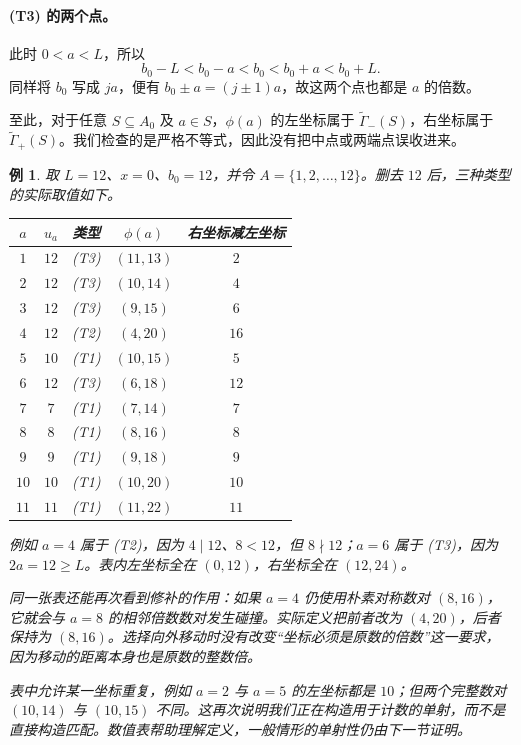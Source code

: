 \documentclass[UTF8,a4paper,oneside,openany,fontset=fandol,zihao=-4]{ctexbook}
\theoremstyle{guide}
\newtheorem{example}[theorem]{例}
\begin{document}
\paragraph{(T3) 的两个点。}
此时 $0<a<L$，所以
\[
  b_0-L<b_0-a<b_0<b_0+a<b_0+L.
\]
同样将 $b_0$ 写成 $ja$，便有 $b_0\pm a=(j\pm1)a$，故这两个点也都是 $a$ 的倍数。

至此，对于任意 $S\subseteq A_0$ 及 $a\in S$，$\phi(a)$ 的左坐标属于 $\widetilde\Gamma_-(S)$，右坐标属于 $\widetilde\Gamma_+(S)$。我们检查的是严格不等式，因此没有把中点或两端点误收进来。

\begin{example}\label{low:type-table}
取 $L=12$、$x=0$、$b_0=12$，并令 $A=\{1,2,\ldots,12\}$。删去 $12$ 后，三种类型的实际取值如下。
\begin{center}
\renewcommand{\arraystretch}{1.12}
\begin{tabular}{c|c|c|c|c}
  $a$ & $u_a$ & 类型 & $\phi(a)$ & 右坐标减左坐标\\
  \hline
  $1$  & $12$ & (T3) & $(11,13)$ & $2$\\
  $2$  & $12$ & (T3) & $(10,14)$ & $4$\\
  $3$  & $12$ & (T3) & $(9,15)$  & $6$\\
  $4$  & $12$ & (T2) & $(4,20)$  & $16$\\
  $5$  & $10$ & (T1) & $(10,15)$ & $5$\\
  $6$  & $12$ & (T3) & $(6,18)$  & $12$\\
  $7$  & $7$  & (T1) & $(7,14)$  & $7$\\
  $8$  & $8$  & (T1) & $(8,16)$  & $8$\\
  $9$  & $9$  & (T1) & $(9,18)$  & $9$\\
  $10$ & $10$ & (T1) & $(10,20)$ & $10$\\
  $11$ & $11$ & (T1) & $(11,22)$ & $11$
\end{tabular}
\end{center}
例如 $a=4$ 属于 (T2)，因为 $4\mid12$、$8<12$，但 $8\nmid12$；$a=6$ 属于 (T3)，因为 $2a=12\geq L$。表内左坐标全在 $(0,12)$，右坐标全在 $(12,24)$。

同一张表还能再次看到修补的作用：如果 $a=4$ 仍使用朴素对称数对 $(8,16)$，它就会与 $a=8$ 的相邻倍数数对发生碰撞。实际定义把前者改为 $(4,20)$，后者保持为 $(8,16)$。选择向外移动时没有改变“坐标必须是原数的倍数”这一要求，因为移动的距离本身也是原数的整数倍。

表中允许某一坐标重复，例如 $a=2$ 与 $a=5$ 的左坐标都是 $10$；但两个完整数对 $(10,14)$ 与 $(10,15)$ 不同。这再次说明我们正在构造用于计数的单射，而不是直接构造匹配。数值表帮助理解定义，一般情形的单射性仍由下一节证明。
\end{example}
\end{document}
